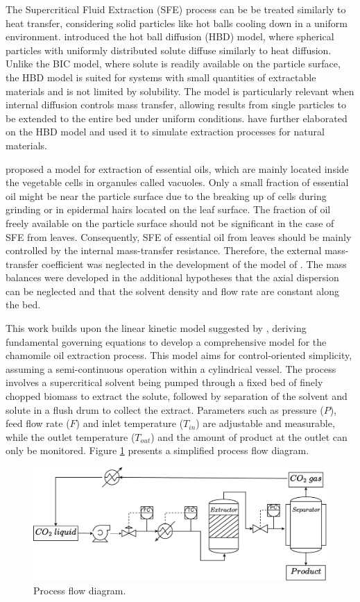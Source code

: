 \documentclass[../Article_Model_Parameters.tex]{subfiles}
\begin{document}
	The Supercritical Fluid Extraction (SFE) process can be be treated similarly to heat transfer, considering solid particles like hot balls cooling down in a uniform environment. \citet{Bartle1990} introduced the hot ball diffusion (HBD) model, where spherical particles with uniformly distributed solute diffuse similarly to heat diffusion. Unlike the BIC model, where solute is readily available on the particle surface, the HBD model is suited for systems with small quantities of extractable materials and is not limited by solubility. The model is particularly relevant when internal diffusion controls mass transfer, allowing results from single particles to be extended to the entire bed under uniform conditions. \citet{Reverchon1993} have further elaborated on the HBD model and used it to simulate extraction processes for natural materials.
		
	\citet{Reverchon1996} proposed a model for extraction of essential oils, which are mainly located inside the vegetable cells in organules called vacuoles. Only a small fraction of essential oil might be near the particle surface due to the breaking up of cells during grinding or in epidermal hairs located on the leaf surface. The fraction of oil freely available on the particle surface should not be significant in the case of SFE from leaves. Consequently, SFE of essential oil from leaves should be mainly controlled by the internal mass-transfer resistance. Therefore, the external mass-transfer coefficient was neglected in the development of the model of \citet{Reverchon1996}. The mass balances were developed in the additional hypotheses that the axial dispersion can be neglected and that the solvent density and flow rate are constant along the bed.
	
	This work builds upon the linear kinetic model suggested by \citet{Reverchon1996}, deriving fundamental governing equations to develop a comprehensive model for the chamomile oil extraction process. This model aims for control-oriented simplicity, assuming a semi-continuous operation within a cylindrical vessel. The process involves a supercritical solvent being pumped through a fixed bed of finely chopped biomass to extract the solute, followed by separation of the solvent and solute in a flush drum to collect the extract. Parameters such as pressure ($P$), feed flow rate ($F$) and inlet temperature ($T_{in}$) are adjustable and measurable, while the outlet temperature ($T_{out}$) and the amount of product at the outlet can only be monitored. Figure \ref{fig: SFE_drawing} presents a simplified process flow diagram.
	
	\begin{figure}[h!]
		\centering
		\includegraphics[width=\columnwidth]{Figures/PFD.drawio.pdf}
		\caption{Process flow diagram.}
		\label{fig: SFE_drawing}
	\end{figure}
	
\end{document}
